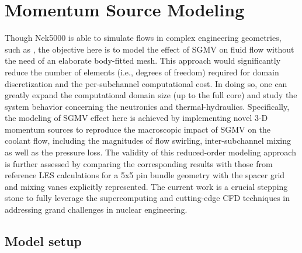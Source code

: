 \section{Momentum Source Modeling}
\label{sec:msm}

Though Nek5000 is able to simulate flows in complex engineering geometries, such as \cite{Busco2019}, the objective here is to model the effect of SGMV on fluid flow without the need of an elaborate body-fitted mesh.
This approach would significantly reduce the number of elements (i.e., degrees of freedom) required for domain discretization and the per-subchannel computational cost. In doing so, one can greatly expand the computational domain size (up to the full core) and study the system behavior concerning the neutronics and thermal-hydraulics.
Specifically, the modeling of SGMV effect here is achieved by implementing novel 3-D momentum sources to reproduce the macroscopic impact of SGMV on the coolant flow, including the magnitudes of flow swirling, inter-subchannel mixing as well as the pressure loss.
The validity of this reduced-order modeling approach is further assessed by comparing the corresponding results with those from reference LES calculations for a 5x5 pin bundle geometry with the spacer grid and mixing vanes explicitly represented.
The current work is a crucial stepping stone to fully leverage the supercomputing and cutting-edge CFD techniques in addressing grand challenges in nuclear engineering.


\subsection{Model setup}
\label{sec:msm1}

